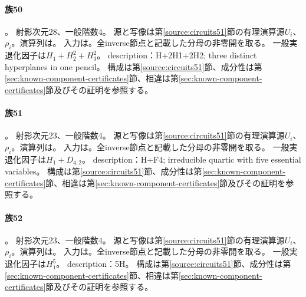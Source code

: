 \paragraph{族50}\label{catalogue:R4_CB}
。
射影次元$28$、一般階数$4$。
源と写像は第\ref{source:circuits51}節の有理演算源$U_i$、$\rho_i$。演算列は。
入力は。全inverse節点と記載した分母の非零開を取る。
一般実退化因子は$H_{1}+H_{2}^{2}+H_{3}^{2}$。
description：H+2H1+2H2; three distinct hyperplanes in one pencil。
構成は第\ref{source:circuits51}節、成分性は第\ref{sec:known-component-certificates}節、相違は第\ref{sec:known-component-certificates}節及びその証明を参照する。

\paragraph{族51}\label{catalogue:R4_H_QUARTIC_ESSENTIAL5}
。
射影次元$23$、一般階数$4$。
源と写像は第\ref{source:circuits51}節の有理演算源$U_i$、$\rho_i$。演算列は。
入力は。全inverse節点と記載した分母の非零開を取る。
一般実退化因子は$H_{1}+D_{4,2}$。
description：H+F4; irreducible quartic with five essential variables。
構成は第\ref{source:circuits51}節、成分性は第\ref{sec:known-component-certificates}節、相違は第\ref{sec:known-component-certificates}節及びその証明を参照する。

\paragraph{族52}\label{catalogue:R4_ZERO_LOG_5H}
。
射影次元$23$、一般階数$4$。
源と写像は第\ref{source:circuits51}節の有理演算源$U_i$、$\rho_i$。演算列は。
入力は。全inverse節点と記載した分母の非零開を取る。
一般実退化因子は$H_{1}^{5}$。
description：5H。
構成は第\ref{source:circuits51}節、成分性は第\ref{sec:known-component-certificates}節、相違は第\ref{sec:known-component-certificates}節及びその証明を参照する。

